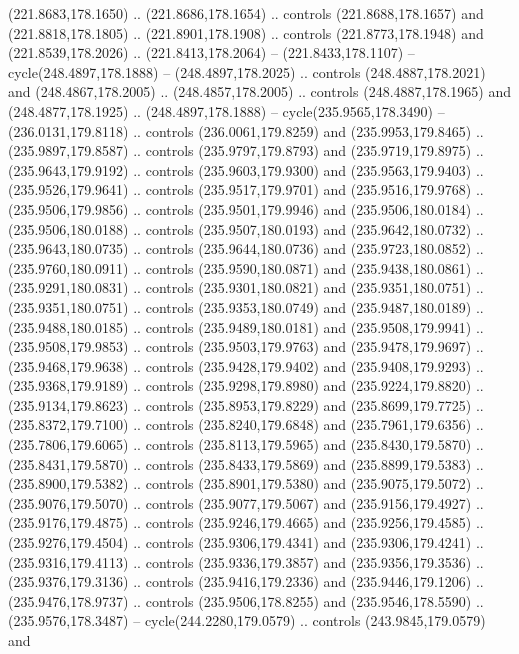 \begin{scope}[cm={{1.25,0.0,0.0,-1.25,(0.0,442.91375)}}]
    (221.8683,178.1650) .. (221.8686,178.1654) .. controls (221.8688,178.1657) and
    (221.8818,178.1805) .. (221.8901,178.1908) .. controls (221.8773,178.1948) and
    (221.8539,178.2026) .. (221.8413,178.2064) -- (221.8433,178.1107) --
    cycle(248.4897,178.1888) -- (248.4897,178.2025) .. controls
    (248.4887,178.2021) and (248.4867,178.2005) .. (248.4857,178.2005) .. controls
    (248.4887,178.1965) and (248.4877,178.1925) .. (248.4897,178.1888) --
    cycle(235.9565,178.3490) -- (236.0131,179.8118) .. controls
    (236.0061,179.8259) and (235.9953,179.8465) .. (235.9897,179.8587) .. controls
    (235.9797,179.8793) and (235.9719,179.8975) .. (235.9643,179.9192) .. controls
    (235.9603,179.9300) and (235.9563,179.9403) .. (235.9526,179.9641) .. controls
    (235.9517,179.9701) and (235.9516,179.9768) .. (235.9506,179.9856) .. controls
    (235.9501,179.9946) and (235.9506,180.0184) .. (235.9506,180.0188) .. controls
    (235.9507,180.0193) and (235.9642,180.0732) .. (235.9643,180.0735) .. controls
    (235.9644,180.0736) and (235.9723,180.0852) .. (235.9760,180.0911) .. controls
    (235.9590,180.0871) and (235.9438,180.0861) .. (235.9291,180.0831) .. controls
    (235.9301,180.0821) and (235.9351,180.0751) .. (235.9351,180.0751) .. controls
    (235.9353,180.0749) and (235.9487,180.0189) .. (235.9488,180.0185) .. controls
    (235.9489,180.0181) and (235.9508,179.9941) .. (235.9508,179.9853) .. controls
    (235.9503,179.9763) and (235.9478,179.9697) .. (235.9468,179.9638) .. controls
    (235.9428,179.9402) and (235.9408,179.9293) .. (235.9368,179.9189) .. controls
    (235.9298,179.8980) and (235.9224,179.8820) .. (235.9134,179.8623) .. controls
    (235.8953,179.8229) and (235.8699,179.7725) .. (235.8372,179.7100) .. controls
    (235.8240,179.6848) and (235.7961,179.6356) .. (235.7806,179.6065) .. controls
    (235.8113,179.5965) and (235.8430,179.5870) .. (235.8431,179.5870) .. controls
    (235.8433,179.5869) and (235.8899,179.5383) .. (235.8900,179.5382) .. controls
    (235.8901,179.5380) and (235.9075,179.5072) .. (235.9076,179.5070) .. controls
    (235.9077,179.5067) and (235.9156,179.4927) .. (235.9176,179.4875) .. controls
    (235.9246,179.4665) and (235.9256,179.4585) .. (235.9276,179.4504) .. controls
    (235.9306,179.4341) and (235.9306,179.4241) .. (235.9316,179.4113) .. controls
    (235.9336,179.3857) and (235.9356,179.3536) .. (235.9376,179.3136) .. controls
    (235.9416,179.2336) and (235.9446,179.1206) .. (235.9476,178.9737) .. controls
    (235.9506,178.8255) and (235.9546,178.5590) .. (235.9576,178.3487) --
    cycle(244.2280,179.0579) .. controls (243.9845,179.0579) and

\end{scope}
